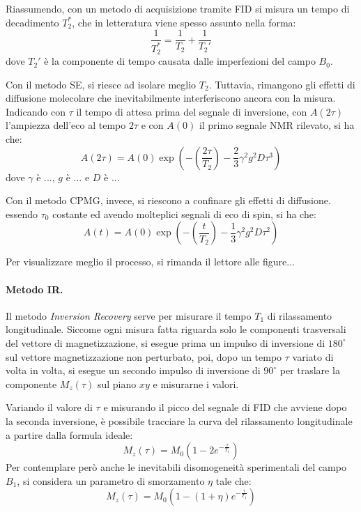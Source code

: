 Riassumendo, con un metodo di acquisizione tramite FID si misura un tempo di decadimento $T_2^*$, che in letteratura viene spesso assunto nella forma:
\begin{equation}
	\frac{1}{T_2^*} = \frac{1}{T_2} +\frac{1}{T_2'}
\end{equation}
dove $T_2'$ è la componente di tempo causata dalle imperfezioni del campo $B_0$.

Con il metodo SE, si riesce ad isolare meglio $T_2$. Tuttavia, rimangono gli effetti di diffusione molecolare che inevitabilmente interferiscono ancora con la misura. Indicando con $\tau$ il tempo di attesa prima del segnale di inversione, con $A(2\tau)$ l'ampiezza dell'eco al tempo $2\tau$ e con $A(0)$ il primo segnale NMR rilevato, si ha che:
\begin{equation}
	A(2\tau) = A(0)\exp\left(-\left(\frac{2\tau}{T_2}\right) - \frac{2}{3} \gamma^2 g^2 D \tau^3\right)
\end{equation}
dove $\gamma$ è ..., $g$ è ... e $D$ è ...

Con il metodo CPMG, invece, si riescono a confinare gli effetti di diffusione. essendo $\tau_0$ costante ed avendo molteplici segnali di eco di spin, si ha che:
\begin{equation}
	A(t) = A(0)\exp\left(-\left(\frac{t}{T_2}\right) - \frac{1}{3} \gamma^2 g^2 D \tau^2\right)
\end{equation}

Per visualizzare meglio il processo, si rimanda il lettore alle figure...

\paragraph{Metodo IR.}

Il metodo \textit{Inversion Recovery} serve per misurare il tempo $T_1$ di rilassamento longitudinale. Siccome ogni misura fatta riguarda solo le componenti trasversali del vettore di magnetizzazione, si esegue prima un impulso di inversione di $180^{\circ}$ sul vettore magnetizzazione non perturbato, poi, dopo un tempo $\tau$ variato di volta in volta, si esegue un secondo impulso di inversione di $90^{\circ}$ per traslare la componente $M_z(\tau)$ sul piano $xy$ e misurarne i valori.

Variando il valore di $\tau$ e misurando il picco del segnale di FID che avviene dopo la seconda inversione, è possibile tracciare la curva del rilassamento longitudinale a partire dalla formula ideale:
\begin{equation}
	M_z(\tau)=M_0\left(1 - 2e^{-\frac{\tau}{T_1}}\right)
\end{equation}
Per contemplare però anche le inevitabili disomogeneità sperimentali del campo $B_1$, si considera un parametro di smorzamento $\eta$ tale che:
\begin{equation}
	M_z(\tau)=M_0\left(1 - (1+\eta)e^{-\frac{\tau}{T_1}}\right)
\end{equation}

